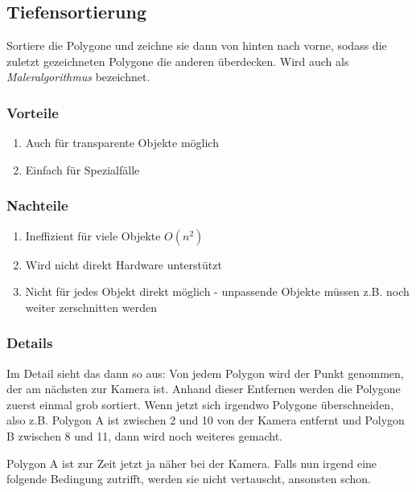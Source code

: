 \subsection{Tiefensortierung}
Sortiere die Polygone und zeichne sie dann von hinten nach vorne, sodass die zuletzt gezeichneten Polygone die anderen überdecken. Wird auch als \textit{Maleralgorithmus} bezeichnet.
\subsubsection{Vorteile}
\begin{enumerate}
	\item Auch für transparente Objekte möglich
	\item Einfach für Spezialfälle
\end{enumerate}
\subsubsection{Nachteile}
\begin{enumerate}
	\item Ineffizient für viele Objekte \(O(n^2)\)
	\item Wird nicht direkt Hardware unterstützt
	\item Nicht für jedes Objekt direkt möglich - unpassende Objekte  müssen z.B. noch weiter zerschnitten werden
\end{enumerate}
\subsubsection{Details}
Im Detail sieht das dann so aus:
Von jedem Polygon wird der Punkt genommen, der am nächsten zur Kamera ist. Anhand dieser Entfernen werden die Polygone zuerst einmal grob sortiert. Wenn jetzt sich irgendwo Polygone überschneiden, also z.B. Polygon A ist zwischen 2 und 10 von der Kamera entfernt und Polygon B zwischen 8 und 11, dann wird noch weiteres gemacht.

Polygon A ist zur Zeit jetzt ja näher bei der Kamera. Falls nun irgend eine folgende Bedingung zutrifft, werden sie nicht vertauscht, ansonsten schon.


